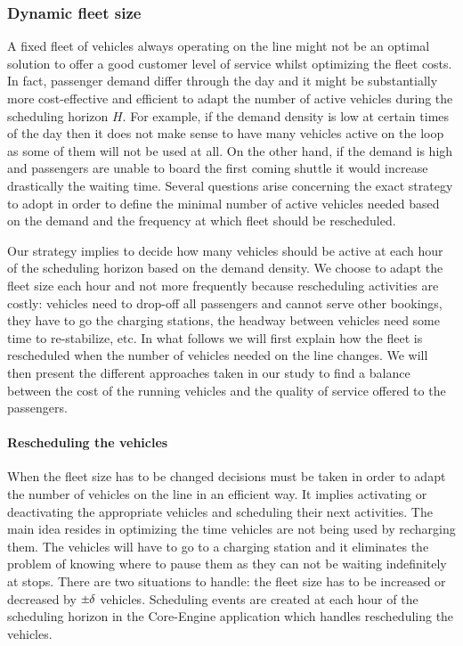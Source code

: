\documentclass[12pt,a4paper]{article}
\newcommand{\Mypm}{\mathbin{\tikz [x=1.4ex,y=1.4ex,line width=.1ex] \draw (0.0,0) -- (1.0,0) (0.5,0.08) -- (0.5,0.92) (0.0,0.5) -- (1.0,0.5);}}%
\begin{document}
\subsubsection{Dynamic fleet size}\label{dynamic}
A fixed fleet of vehicles always operating on the line might not be an optimal solution to offer a good customer level of service whilst optimizing the fleet costs. In fact, passenger demand differ through the day and it might be substantially more cost-effective and efficient to adapt the number of active vehicles during the scheduling horizon $H$. For example, if the demand density is low at certain times of the day then it does not make sense to have many vehicles active on the loop as some of them will not be used at all. On the other hand, if the demand is high and passengers are unable to board the first coming shuttle it would increase drastically the waiting time. Several questions arise concerning the exact strategy to adopt in order to define the minimal number of active vehicles needed based on the demand and the frequency at which fleet should be rescheduled. 

Our strategy implies to decide how many vehicles should be active at each hour of the scheduling horizon based on the demand density.  We choose to adapt the fleet size each hour and not more frequently because rescheduling activities are costly: vehicles need to drop-off all passengers and cannot serve other bookings, they have to go the charging stations, the headway between vehicles need some time to re-stabilize, etc. In what follows we will first explain how the fleet is rescheduled when the number of vehicles needed on the line changes. We will then present the different approaches taken in our study to find a balance between the cost of the running vehicles and the quality of service offered to the passengers. 

\paragraph{Rescheduling the vehicles} When the fleet size has to be changed decisions must be taken in order to adapt the number of vehicles on the line in an efficient way. It implies activating or deactivating the appropriate vehicles and scheduling their next activities. The main idea resides in optimizing the time vehicles are not being used by recharging them. The vehicles will have to go to a charging station and it eliminates the problem of knowing where to pause them as they can not be waiting indefinitely at stops. There are two situations to handle: the fleet size has to be increased or decreased by $\Mypm \delta$ vehicles. Scheduling events are created at each hour of the scheduling horizon in the Core-Engine application which handles rescheduling the vehicles.
\end{document}
